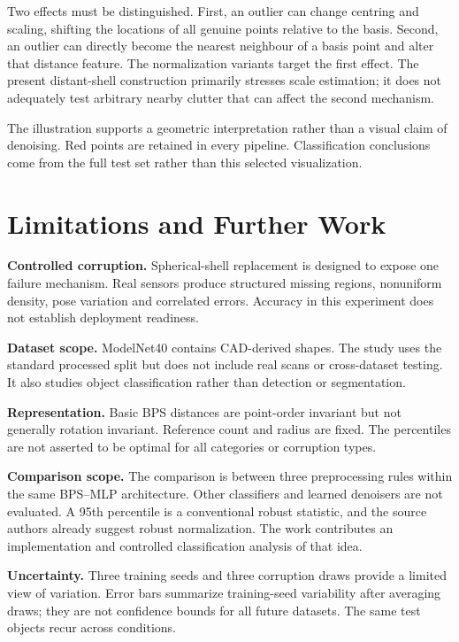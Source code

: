 \documentclass[11pt,a4paper]{article}
\begin{document}


Two effects must be distinguished. First, an outlier can change centring and scaling, shifting the locations of all genuine points relative to the basis. Second, an outlier can directly become the nearest neighbour of a basis point and alter that distance feature. The normalization variants target the first effect. The present distant-shell construction primarily stresses scale estimation; it does not adequately test arbitrary nearby clutter that can affect the second mechanism.

The illustration supports a geometric interpretation rather than a visual claim of denoising. Red points are retained in every pipeline. Classification conclusions come from the full test set rather than this selected visualization.
\clearpage

\section{Limitations and Further Work}
\textbf{Controlled corruption.} Spherical-shell replacement is designed to expose one failure mechanism. Real sensors produce structured missing regions, nonuniform density, pose variation and correlated errors. Accuracy in this experiment does not establish deployment readiness.

\textbf{Dataset scope.} ModelNet40 contains CAD-derived shapes. The study uses the standard processed split but does not include real scans or cross-dataset testing. It also studies object classification rather than detection or segmentation.

\textbf{Representation.} Basic BPS distances are point-order invariant but not generally rotation invariant. Reference count and radius are fixed. The percentiles are not asserted to be optimal for all categories or corruption types.

\textbf{Comparison scope.} The comparison is between three preprocessing rules within the same BPS--MLP architecture. Other classifiers and learned denoisers are not evaluated. A 95th percentile is a conventional robust statistic, and the source authors already suggest robust normalization. The work contributes an implementation and controlled classification analysis of that idea.

\textbf{Uncertainty.} Three training seeds and three corruption draws provide a limited view of variation. Error bars summarize training-seed variability after averaging draws; they are not confidence bounds for all future datasets. The same test objects recur across conditions.
\end{document}
